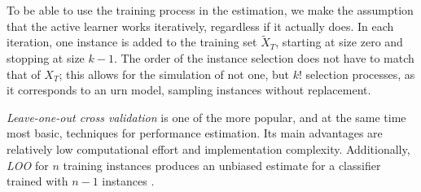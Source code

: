 To be able to use the training process in the estimation, we make the assumption that the active learner works iteratively, regardless if it actually does. In each iteration, one instance is added to the training set $\tilde{X}_T$, starting at size zero and stopping at size $k-1$. The order of the instance selection does not have to match that of $X_T$; this allows for the simulation of not one, but $k!$ selection processes, as it corresponds to an urn model, sampling instances without replacement.

\textit{Leave-one-out cross validation} is one of the more popular, and at the same time most basic, techniques for performance estimation. Its main advantages are relatively low computational effort and implementation complexity. Additionally, \textit{LOO} for $n$ training instances produces an unbiased estimate for a classifier trained with $n-1$ instances \cite{RodriguezEtAl2013}. 